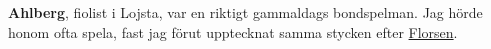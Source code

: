 \textbf{Ahlberg}, fiolist i Lojsta, var en riktigt gammaldags bondspelman. Jag hörde honom ofta spela, fast jag förut upptecknat samma stycken efter \href{Florsen}{Florsen}. 
